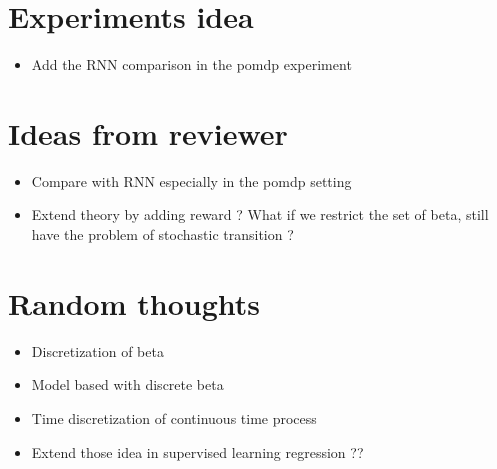 \documentclass[11pt]{report}
\begin{document}
\section{Experiments idea}
\begin{itemize}
	\item Add the RNN comparison in the pomdp experiment
\end{itemize}
\section{Ideas from reviewer}
\begin{itemize}
	\item Compare with RNN especially in the pomdp setting
	\item Extend theory by adding reward ? What if we restrict the set of beta, still have the problem of stochastic transition ? 
\end{itemize}
\section{Random thoughts}
\begin{itemize}
	\item Discretization of beta
	\item Model based with discrete beta
	\item Time discretization of continuous time process 
	\item Extend those idea in supervised learning regression ??
\end{itemize}
\end{document}
